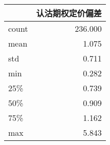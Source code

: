 \begin{tabular}{lr}
\toprule
{} &  认沽期权定价偏差 \\
\midrule
count &   236.000 \\
mean  &     1.075 \\
std   &     0.711 \\
min   &     0.282 \\
25\%   &     0.739 \\
50\%   &     0.909 \\
75\%   &     1.162 \\
max   &     5.843 \\
\bottomrule
\end{tabular}
